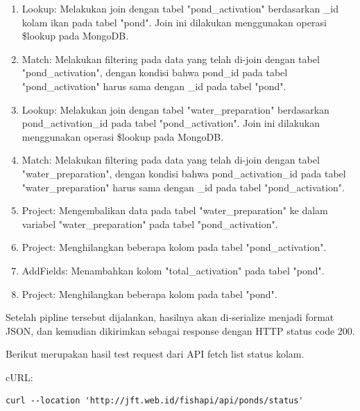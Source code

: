 \begin{enumerate}[1.]
\begin{enumerate}
\item Lookup: Melakukan join dengan tabel "pond\_activation" berdasarkan \_id kolam ikan pada tabel "pond". Join ini dilakukan menggunakan operasi \$lookup pada MongoDB.

\item Match: Melakukan filtering pada data yang telah di-join dengan tabel "pond\_activation", dengan kondisi bahwa pond\_id pada tabel "pond\_activation" harus sama dengan \_id pada tabel "pond".

\item Lookup: Melakukan join dengan tabel "water\_preparation" berdasarkan pond\_activation\_id pada tabel "pond\_activation". Join ini dilakukan menggunakan operasi \$lookup pada MongoDB.

\item Match: Melakukan filtering pada data yang telah di-join dengan tabel "water\_preparation", dengan kondisi bahwa pond\_activation\_id pada tabel "water\_preparation" harus sama dengan \_id pada tabel "pond\_activation".

\item Project: Mengembalikan data pada tabel "water\_preparation" ke dalam variabel "water\_preparation" pada tabel "pond\_activation".

\item Project: Menghilangkan beberapa kolom pada tabel "pond\_activation".

\item AddFields: Menambahkan kolom "total\_activation" pada tabel "pond".

\item Project: Menghilangkan beberapa kolom pada tabel "pond".
\end{enumerate}

Setelah pipline tersebut dijalankan, hasilnya akan di-serialize menjadi format JSON, dan kemudian dikirimkan sebagai response dengan HTTP status code 200.

Berikut merupakan hasil test request dari API fetch list status kolam.

cURL:
\begin{lstlisting}
curl --location 'http://jft.web.id/fishapi/api/ponds/status'
\end{lstlisting}


\end{enumerate}
